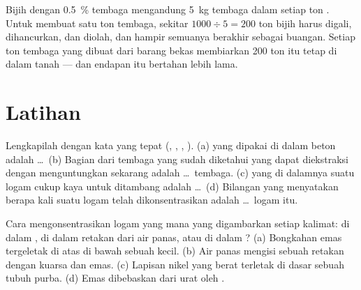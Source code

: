 \begin{example}\label{ex:g9:earth-resources:recycling}
Bijih dengan \qty{0.5}{\%} tembaga mengandung \qty{5}{kg} tembaga dalam
setiap ton . Untuk membuat satu ton tembaga, sekitar
$1000 \div 5 = 200$ ton bijih harus digali, dihancurkan, dan diolah, dan
hampir semuanya berakhir sebagai  buangan. Setiap ton tembaga yang
dibuat dari barang bekas membiarkan 200 ton  itu tetap di dalam
tanah --- dan endapan itu bertahan lebih lama.
\end{example}


\section{Latihan}

\begin{exercise}[$\star$]\label{exo:g9:earth-resources:1}
Lengkapilah dengan kata yang tepat (, ,
, ). (a)  yang dipakai di dalam beton adalah
\ldots\ (b) Bagian dari tembaga yang sudah diketahui yang dapat
diekstraksi dengan menguntungkan sekarang adalah \ldots\ tembaga. (c) 
yang di dalamnya suatu logam cukup kaya untuk ditambang adalah
\ldots\ (d) Bilangan yang menyatakan berapa kali suatu logam telah
dikonsentrasikan adalah \ldots\ logam itu.
\end{exercise}

\begin{exercise}[$\star$]\label{exo:g9:earth-resources:2}
Cara mengonsentrasikan logam yang mana yang digambarkan setiap kalimat:
di dalam , di dalam retakan dari air panas, atau di dalam 
? (a) Bongkahan emas tergeletak di atas  di bawah
 sebuah  kecil. (b) Air panas mengisi sebuah retakan dengan
kuarsa dan emas. (c) Lapisan  nikel yang berat terletak di dasar
sebuah tubuh  purba. (d) Emas dibebaskan dari urat oleh .
\end{exercise}

